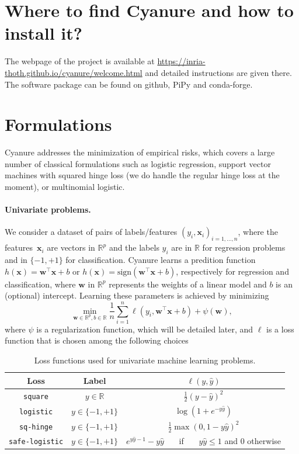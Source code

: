 \documentclass{article}
\def\x{{\mathbf{x}}}
\def\w{{\mathbf{w}}}
\def\haty{{\hat{y}}}
\def\wb{{\mathbf{w}}}
\def\Real{{\mathbb{R}}}
\begin{document}
\section{Where to find Cyanure and how to install it?}
The webpage of the project is available at \url{https://inria-thoth.github.io/cyanure/welcome.html} and detailed instructions are given there. The software package can be found on github, PiPy and conda-forge.

\section{Formulations}\label{sec:formulations}
Cyanure addresses the minimization of empirical risks, which covers a large
number of classical formulations such as logistic regression, support vector
machines with squared hinge loss (we do handle the regular hinge loss at the
moment), or multinomial logistic.


\paragraph{Univariate problems.} We consider a dataset of pairs of
labels/features $(y_i,\x_i)_{i=1,\ldots,n}$, where the features~$\x_i$ are
vectors in $\Real^p$ and the labels $y_i$ are in $\Real$ for regression
problems and in $\{-1,+1\}$ for classification.
Cyanure learns a predition function $h(\x)= \w^\top \x + b$ or $h(\x)=\text{sign}(\w^\top \x + b)$, respectively for regression and classification, 
where $\w$ in
$\Real^p$ represents the weights of a linear model and $b$ is an (optional)
intercept. Learning these parameters is achieved by minimizing
\begin{displaymath}
   \min_{\w \in \Real^p, b \in \Real} \frac{1}{n}\sum_{i=1}^n \ell(y_i, \wb^\top \x + b)  + \psi(\w), 
\end{displaymath}
where $\psi$ is a regularization function, which will be detailed later, and $\ell$ is a loss function that is chosen among the following choices
\begin{table}[h!]
   \centering
   \begin{tabular}{|c|c|c|}
      \hline
      Loss  & Label  &  $\ell(y, \hat{y})$ \\  
      \hline
      \texttt{square} &  $y \in \Real$ &  $\frac{1}{2}( y-\haty)^2$ \\ 
      \hline
      \texttt{logistic} &  $y \in \{-1,+1\}$ &  $ \log(1+e^{-y \hat{y}})$ \\ 
      \hline
      \texttt{sq-hinge} &  $y \in \{-1,+1\}$ &  $ \frac{1}{2}\max(0,1-y \hat{y})^2$ \\ 
      \hline
      \texttt{safe-logistic} &  $y \in \{-1,+1\}$ &  $e^{y \haty -1}- y \haty $~~~ if~~~ $ y \haty \leq 1$ and $0$ otherwise \\ 
      \hline
   \end{tabular}
   \caption{Loss functions used for univariate machine learning problems.} \label{table:loss}
\end{table}
\end{document}
